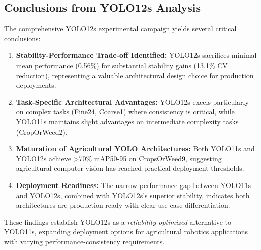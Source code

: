 \subsection{Conclusions from YOLO12s Analysis}

The comprehensive YOLO12s experimental campaign yields several critical conclusions:

\begin{enumerate}
    \item \textbf{Stability-Performance Trade-off Identified:} YOLO12s sacrifices minimal mean performance (0.56\%) for substantial stability gains (13.1\% CV reduction), representing a valuable architectural design choice for production deployments.
    
    \item \textbf{Task-Specific Architectural Advantages:} YOLO12s excels particularly on complex tasks (Fine24, Coarse1) where consistency is critical, while YOLO11s maintains slight advantages on intermediate complexity tasks (CropOrWeed2).
    
    \item \textbf{Maturation of Agricultural YOLO Architectures:} Both YOLO11s and YOLO12s achieve >70\% mAP50-95 on CropsOrWeed9, suggesting agricultural computer vision has reached practical deployment thresholds.
    
    \item \textbf{Deployment Readiness:} The narrow performance gap between YOLO11s and YOLO12s, combined with YOLO12s's superior stability, indicates both architectures are production-ready with clear use-case differentiation.
\end{enumerate}

These findings establish YOLO12s as a \textit{reliability-optimized} alternative to YOLO11s, expanding deployment options for agricultural robotics applications with varying performance-consistency requirements.
